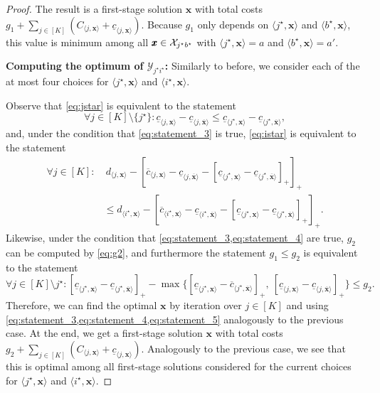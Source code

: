 \begin{proof}
The result is a first-stage solution $\pmb{x}$ 
with total costs $g_1 + \sum_{j \in [K]} (C_{\langle j,\pmb{x}\rangle} + \underline{c}_{\langle j,\pmb{x}\rangle})$. 
Because $g_1$ only depends on $\langle j^\star,\pmb{x}\rangle$ and $\langle b^\star,\pmb{x}\rangle$, this value is minimum among all $\pmb x \in \mathcal{X}_{j^\star b^\star}$ with 
$\langle j^\star,\pmb{x}\rangle = a$ and $\langle b^\star,\pmb{x}\rangle = a'$.

\textbf{Computing the optimum of $\mathcal{Y}_{j^\star i^\star}$:} 
Similarly to before, we consider each of the at most four choices for 
$\langle j^\star,\pmb{x}\rangle$ and $\langle i^\star,\pmb{x}\rangle$.

Observe that \cref{eq:jstar} is equivalent to the statement
\begin{equation}
\forall j \in [K] \setminus \{ j^\star \} :  \underline{c}_{\langle j,\pmb{x}\rangle} - \underline{c}_{\langle j, \overline{\pmb{x}} \rangle} \leq \underline{c}_{\langle j^\star, \pmb{x}\rangle} - \underline{c}_{\langle j^\star,\overline{\pmb{x}}\rangle},
\label{eq:statement_3}
\end{equation}
and, under the condition that \cref{eq:statement_3} is true, \cref{eq:istar} is equivalent to the statement
\begin{align}
\forall j \in [K] \colon & \ d_{\langle j,\pmb{x}\rangle} - [\overline{c}_{\langle j,\pmb{x}\rangle}-\underline{c}_{\langle j, \overline{\pmb{x}}\rangle} - [\underline{c}_{\langle j^\star, \pmb{x}\rangle} - \underline{c}_{\langle j^\star, \overline{\pmb{x}}\rangle}]_+]_+ \nonumber \\ 
 & \leq d_{\langle i^\star,\pmb{x}\rangle} - [\overline{c}_{\langle i^\star,\pmb{x}\rangle}-\underline{c}_{\langle i^\star,\overline{\pmb{x}}\rangle} - [\underline{c}_{\langle j^\star,\pmb{x}\rangle} - \underline{c}_{\langle j^\star,\overline{\pmb{x}}\rangle}]_+]_+.
\label{eq:statement_4}
\end{align}
Likewise, under the condition that \cref{eq:statement_3,eq:statement_4} are true, $g_2$ can be computed by \cref{eq:g2}, and furthermore the statement $g_1 \leq g_2$ is equivalent to the statement
\begin{equation}
\forall j \in [K] \setminus{j^\star}: [\underline{c}_{\langle j^\star,\pmb{x}\rangle} - \underline{c}_{\langle j^\star,\overline{\pmb{x}}\rangle}]_+ - \max\{[\underline{c}_{\langle j^\star,\pmb{x}\rangle} - \overline{c}_{\langle j^\star,\overline{\pmb{x}}\rangle}]_+,\ [\underline{c}_{\langle j,\pmb{x}\rangle} - \underline{c}_{\langle j,\overline{\pmb{x}}\rangle}]_+ \} \leq g_2.
\label{eq:statement_5}
\end{equation}
Therefore, we can find the optimal $\pmb x$ by iteration over $j \in [K]$ and using \cref{eq:statement_3,eq:statement_4,eq:statement_5} analogously to the previous case.
At the end, we get a first-stage solution $\pmb{x}$ with total costs $g_2 + \sum_{j \in [K]} (C_{\langle j,\pmb{x}\rangle} + \underline{c}_{\langle j, \pmb{x}\rangle})$. 
Analogously to the previous case, we see that this is optimal among all first-stage solutions considered 
for the current choices for $\langle j^\star,\pmb{x}\rangle$ and $\langle i^\star,\pmb{x}\rangle$.
\end{proof}


